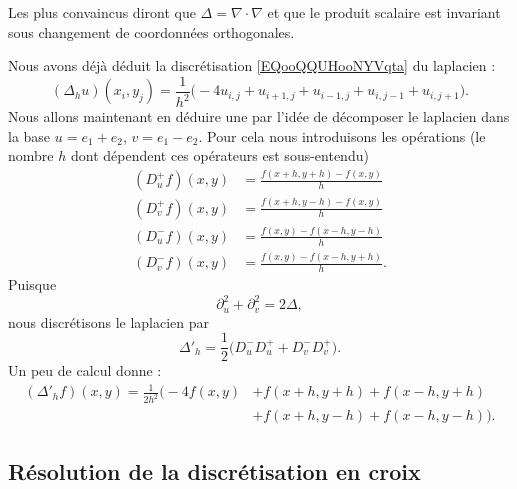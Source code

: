 Les plus convaincus diront que \( \Delta=\nabla\cdot\nabla\) et que le produit scalaire est invariant sous changement de coordonnées orthogonales.

Nous avons déjà déduit la discrétisation \eqref{EQooQQUHooNYVqta} du laplacien :
\begin{equation}
	(\Delta_hu)(x_i,y_j)=\frac{1}{ h^2 }\big( -4u_{i,j}+u_{i+1,j}+u_{i-1,j}+u_{i,j-1}+u_{i,j+1} \big).
\end{equation}
Nous allons maintenant en déduire une par l'idée de décomposer le laplacien dans la base \( u=e_1+e_2\), \( v=e_1-e_2\). Pour cela nous introduisons les opérations (le nombre \( h\) dont dépendent ces opérateurs est sous-entendu)
\begin{subequations}
	\begin{align}
		(D^+_uf)(x,y) & =\frac{ f(x+h,y+h)-f(x,y) }{ h }  \\
		(D^+_vf)(x,y) & =\frac{ f(x+h,y-h)-f(x,y) }{ h }  \\
		(D^-_uf)(x,y) & =\frac{ f(x,y)-f(x-h,y-h) }{ h }  \\
		(D^-_vf)(x,y) & =\frac{ f(x,y)-f(x-h,y+h) }{ h }.
	\end{align}
\end{subequations}
Puisque
\begin{equation}
	\partial_u^2+\partial_v^2=2\Delta,
\end{equation}
nous discrétisons le laplacien par
\begin{equation}
	\Delta'_h=\frac{ 1 }{2}\big( D_u^-D_u^++D_v^-D_v^+ \big).
\end{equation}
Un peu de calcul donne :
\begin{subequations}   \label{EQooLHBDooSBFkho}
	\begin{align}
		(\Delta'_hf)(x,y)=\frac{1}{ 2h^2 }\Big( -4f(x,y) & +f(x+h,y+h)+f(x-h,y+h)        \\
		                                                 & +f(x+h,y-h)+f(x-h,y-h) \Big).
	\end{align}
\end{subequations}

\subsection{Résolution de la discrétisation en croix}

